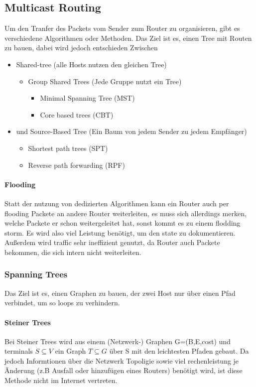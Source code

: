 	\subsection{Multicast Routing}
		Um den Tranfer des Packets vom Sender zum Router zu organisieren, gibt es verschiedene Algorithmen oder Methoden. Das Ziel ist es, einen Tree mit Routen zu bauen, dabei wird jedoch entschieden Zwischen 
		\begin{itemize}
			\item Shared-tree (alle Hosts nutzen den gleichen Tree)
				\begin{itemize}
					\item Group Shared Trees (Jede Gruppe nutzt ein Tree)
						\begin{itemize}
							\item Minimal Spanning Tree (MST)
							\item Core based trees (CBT)
						\end{itemize}
				\end{itemize}
			\item und Source-Based Tree (Ein Baum von jedem Sender zu jedem Empfänger)
				\begin{itemize}
					\item Shortest path trees (SPT)
					\item Reverse path forwarding (RPF)
				\end{itemize}
		\end{itemize}

		\paragraph{Flooding}
			Statt der nutzung von dedizierten Algorithmen kann ein Router auch per flooding Packete an andere Router weiterleiten, es muss sich allerdings merken, welche Packete er schon weitergeleitet hat, sonst kommt es zu einem flodding storm. Es wird also viel Leistung benötigt, um den state zu dokumentieren. Außerdem wird traffic sehr ineffizient genutzt, da Router auch Packete bekommen, die sich intern nicht weiterleiten. 
		
		\subsubsection{Spanning Trees}
			Das Ziel ist es, einen Graphen zu bauen, der zwei Host nur über einen Pfad verbindet, um so loops zu verhindern. 

			\paragraph{Steiner Trees}
				Bei Steiner Trees wird aus einem (Netzwerk-) Graphen G=(B,E,cost) und terminals $S\subseteq V$ ein Graph $T\subseteq G$ über S mit den leichtesten Pfaden gebaut. Da jedoch Informtionen über die Netzwerk Topoligie sowie viel rechenleistung je Änderung (z.B Ausfall oder hinzufügen eines Routers) benötigt wird, ist diese Methode nicht im Internet vertreten. 
			
